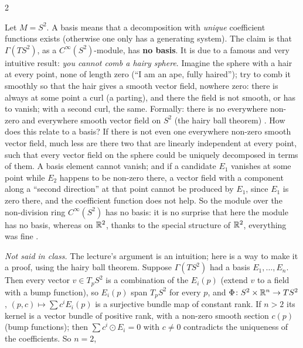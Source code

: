 \begin{paracol}{2}
\begin{example}\label{ex:rm-s2}
Let $M=S^2$. A basis means that a decomposition with \emph{unique} coefficient functions exists (otherwise one only has a generating system). The claim is that $\Gamma(TS^2)$, as a $C^\infty(S^2)$-module, has \textbf{no basis}. It is due to a famous and very intuitive result: \emph{you cannot comb a hairy sphere}. Imagine the sphere with a hair at
every point, none of length zero (``I am an ape, fully haired''); try to comb it smoothly so that the hair gives a smooth vector field, nowhere zero: there is always at some point a curl (a parting), and there the field is not smooth, or has to vanish; with a second curl, the same. Formally: there is no everywhere non-zero and everywhere
smooth vector field on $S^2$ (the hairy ball theorem)           .
How does this relate to a basis? If there is not even one everywhere non-zero smooth vector field, much less are there two that are linearly independent at every point, such that every vector field on the sphere could be uniquely decomposed in terms of them. A basis element cannot vanish; and if a candidate $E_1$ vanishes at some
point while $E_2$ happens to be non-zero there, a vector field with a component along a ``second direction'' at that point cannot be produced by $E_1$, since $E_1$ is zero there, and the coefficient function does not help. So the module over the non-division ring $C^\infty(S^2)$ has no basis: it is no surprise that here the module has no basis, whereas on $\mathbb{R}^2$, thanks to the special structure
of $\mathbb{R}^2$, everything was fine       .
\end{example}
\begin{secondary}
\emph{Not said in class.} The lecture's argument is an intuition; here is a way to make it a proof, using the hairy ball theorem. Suppose $\Gamma(TS^2)$ had a basis $E_1,\dots,E_n$. Then every vector $v\in T_pS^2$ is a combination of the $E_i(p)$ (extend $v$ to a field with a bump function), so $E_i(p)$ span $T_pS^2$ for every $p$, and
$\Phi\colon S^2\times\mathbb{R}^n\to TS^2$, $(p,c)\mapsto\sum c^iE_i(p)$ is a surjective bundle map of constant rank. If $n>2$ its kernel is a vector bundle of positive rank, with a non-zero smooth section $c(p)$ (bump functions); then $\sum c^i\odot E_i=0$ with $c\ne0$ contradicts the uniqueness of the coefficients. So $n=2$,

\end{secondary}
\end{paracol}
